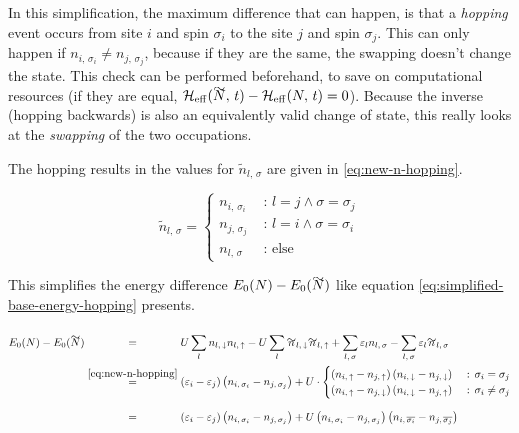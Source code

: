 In this simplification, the maximum difference that can happen, is that a \emph{hopping} event occurs from site $i$ and spin $\sigma_i$ to the site $j$ and spin $\sigma_j$. 
This can only happen if $n_{i,\,\sigma_i} \neq n_{j,\,\sigma_j}$, because if they are the same, the swapping doesn't change the state. 
This check can be performed beforehand, to save on computational resources (if they are equal, $\HeffOft[\vphantom{N}\smash{\tilde{N}}]-\HeffOft[N] = 0$).
Because the inverse (hopping backwards) is also an equivalently valid change of state, this really looks at the \emph{swapping} of the two occupations.

The hopping results in the values for $\tilde{n}_{l,\,\sigma}$ are given in \autoref{eq:new-n-hopping}.

\begin{equation}
    \label{eq:new-n-hopping}
    \tilde{n}_{l,\,\sigma} = \begin{cases}
        n_{i,\,\sigma_i}&\text{ : } l = j \land \sigma = \sigma_j   \\
        n_{j,\,\sigma_j}&\text{ : } l = i \land \sigma = \sigma_i   \\
        n_{l,\,\sigma} &\text{ : else}
    \end{cases}
\end{equation}

This simplifies the energy difference $E_0(N)-E_0(\vphantom{N}\smash{\tilde{N}})$ like equation \autoref{eq:simplified-base-energy-hopping} presents.

\begin{equation}
    \label{eq:simplified-base-energy-hopping}
    \begin{split}
        E_0(N)-E_0(\vphantom{N}\smash{\tilde{N}}) 
        &\stackrel{\phantom{\ref{eq:new-n-hopping}}}{=} U\lsum n_{l,\,\down}n_{l,\,\up}-U\lsum \tilde{n}_{l,\,\down}\tilde{n}_{l,\,\up} 
        + \lsum[l,\,\sigma] \epsl n_{l,\,\sigma} - \lsum[l,\,\sigma] \epsl \tilde{n}_{l,\,\sigma}\\
        &\stackrel{\ref{eq:new-n-hopping}}{=} \left(\epsl[i]-\epsl[j]\right)\left(n_{i,\,\sigma_i} - n_{j,\,\sigma_j}\right) +
        U\cdot \begin{cases}
            \left(n_{i,\,\up}-n_{j,\,\up}\right) \left(n_{i,\,\down}-n_{j,\,\down}\right) &\text{ : } \sigma_i = \sigma_j   \\
            \left(n_{i,\,\up}-n_{j,\,\down}\right) \left(n_{i,\,\down}-n_{j,\,\up}\right) &\text{ : } \sigma_i \neq \sigma_j
        \end{cases}\\
        &\stackrel{\phantom{\ref{eq:new-n-hopping}}}{=} \left(\epsl[i]-\epsl[j]\right)\left(n_{i,\,\sigma_i} - n_{j,\,\sigma_j}\right) +
        U \left(n_{i,\,\sigma_i}-n_{j,\,\sigma_j}\right) \left(n_{i,\,\overline{\sigma_i}}-n_{j,\,\overline{\sigma_j}}\right)
    \end{split}
\end{equation}

